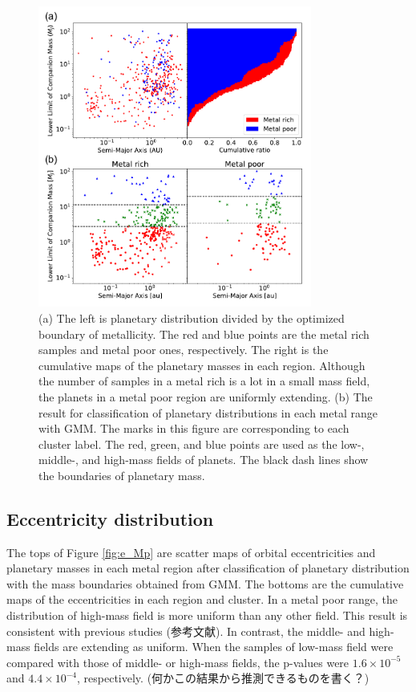 \documentclass[twocolumn, dvipdfmx]{aastex62}
\begin{document}
\begin{CJK*}{UTF8}{min}
\begin{figure}[t]
\begin{center}
\includegraphics[width=9cm]{../../../Figure/a_Mp.pdf}
\caption{(a) The left is planetary distribution divided by the optimized boundary of metallicity. The red and blue points are the metal rich samples and metal poor ones, respectively. The right is the cumulative maps of the planetary masses in each region. Although the number of samples in a metal rich is a lot in a small mass field, the planets in a metal poor region are uniformly extending. (b) The result for classification of planetary distributions in each metal range with GMM. The marks in this figure are corresponding to each cluster label. The red, green, and blue points are used as the low-, middle-, and high-mass fields of planets. The black dash lines show the boundaries of planetary mass. \label{fig:a_Mp}}
\end{center}
\end{figure}


\subsection{Eccentricity distribution} \label{subsec:eccentricity}

The tops of Figure \ref{fig:e_Mp} are scatter maps of orbital eccentricities and planetary masses in each metal region after classification of planetary distribution with the mass boundaries obtained from GMM. The bottoms are the cumulative maps of the eccentricities in each region and cluster. In a metal poor range, the distribution of high-mass field is more uniform than any other field. This result is consistent with previous studies (参考文献). In contrast, the middle- and high-mass fields are extending as uniform. When the samples of low-mass field were compared with those of middle- or high-mass fields, the p-values were $1.6\times10^{-5}$ and $4.4\times10^{-4}$, respectively. (何かこの結果から推測できるものを書く？)


\end{CJK*}
\end{document}
